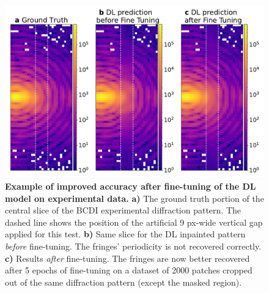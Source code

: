 \begin{figure}[H]
    \centering
    \includegraphics[width=\textwidth]{figures/Inpainting/FineTuning.pdf}
    \caption{\textbf{Example of improved accuracy after fine-tuning of the DL model on experimental data.} \textbf{a)} 
    The ground truth portion of the central slice of the BCDI experimental diffraction pattern. The dashed line 
    shows the position of the artificial 9 px-wide vertical gap applied for this test. \textbf{b)} Same slice 
    for the DL inpainted pattern \textit{before} fine-tuning. The fringes' periodicity is not recovered correctly. 
    \textbf{c)} Results \textit{after} fine-tuning. The fringes are now better recovered after 5 epochs of fine-tuning 
    on a dataset of 2000 patches cropped out of the same diffraction pattern (except the masked region). }
    \label{fig:fine_tuning}
\end{figure}


